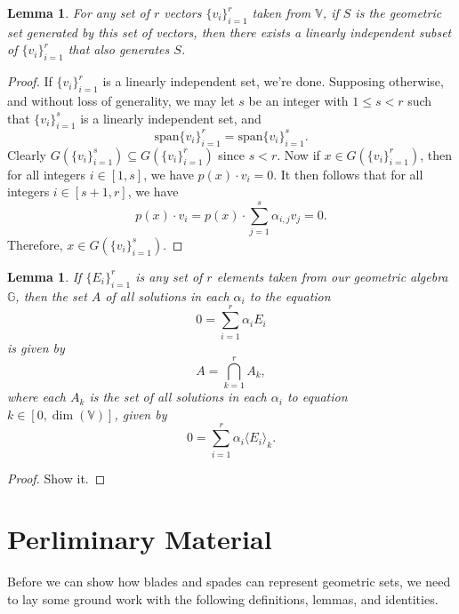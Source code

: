 \documentclass{birkjour}
\newtheorem{lem}[thm]{Lemma}
\theoremstyle{definition}
\theoremstyle{remark}
\numberwithin{equation}{section}
\newcommand{\G}{\mathbb{G}}
\newcommand{\V}{\mathbb{V}}
\begin{document}
\begin{lem}\label{lem_reduce_vec_set}
For any set of $r$ vectors $\{v_i\}_{i=1}^r$ taken from $\V$, if $S$ is the geometric set generated by
this set of vectors, then there exists a linearly independent subset of $\{v_i\}_{i=1}^r$ that also generates $S$.
\end{lem}
\begin{proof}
If $\{v_i\}_{i=1}^r$ is a linearly independent set, we're done.  Supposing otherwise, and without loss of generality,
we may let $s$ be an integer with $1\leq s<r$ such that $\{v_i\}_{i=1}^s$ is a linearly independent set, and
\begin{equation*}
\mbox{span}\{v_i\}_{i=1}^r = \mbox{span}\{v_i\}_{i=1}^s.
\end{equation*}
Clearly $G(\{v_i\}_{i=1}^s)\subseteq G(\{v_i\}_{i=1}^r)$ since $s<r$.
Now if $x\in G(\{v_i\}_{i=1}^r)$, then for all integers $i\in[1,s]$, we have $p(x)\cdot v_i=0$.
It then follows that for all integers $i\in[s+1,r]$, we have
\begin{equation*}
p(x)\cdot v_i = p(x)\cdot\sum_{j=1}^s\alpha_{i,j}v_j = 0.
\end{equation*}
Therefore, $x\in G(\{v_i\}_{i=1}^s)$.
\end{proof}

\begin{lem}\label{lem_solution_intersection}
If $\{E_i\}_{i=1}^r$ is any set of $r$ elements taken from our geometric algebra $\G$, then the set $A$ of all solutions in each $\alpha_i$
to the equation
\begin{equation*}
0 = \sum_{i=1}^r\alpha_i E_i
\end{equation*}
is given by
\begin{equation*}
A = \bigcap_{k=1}^r A_k,
\end{equation*}
where each $A_k$ is the set of all solutions in each $\alpha_i$ to equation $k\in[0,\dim(\V)]$, given by
\begin{equation*}
0 = \sum_{i=1}^r\alpha_i\langle E_i\rangle_k.
\end{equation*}
\end{lem}
\begin{proof}
Show it.
\end{proof}

\section{Perliminary Material}

Before we can show how blades and spades can represent geometric sets, we need to lay some ground work
with the following definitions, lemmas, and identities.
\end{document}
